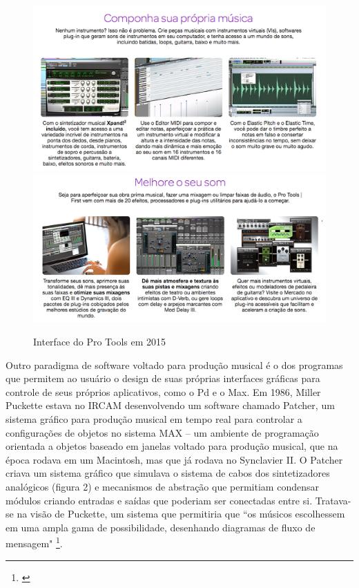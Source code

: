 \begin{figure}
    \caption{\label{protools}Interface do Pro Tools em 2015 }
    
        \includegraphics[width=0.8\linewidth]{pictures/protools}
        \includegraphics[width=0.8\linewidth]{pictures/protools2}
    
\end{figure}

Outro paradigma de software voltado para produção musical é o dos programas que permitem ao usuário o design de suas próprias interfaces gráficas para controle de seus próprios aplicativos, como o Pd e o Max. Em 1986, Miller Puckette estava no IRCAM desenvolvendo um software chamado Patcher, um sistema gráfico para produção musical em tempo real para controlar a configurações de objetos no sistema MAX – um ambiente de programação orientada a objetos baseado em janelas voltado para produção musical, que na época rodava em um Macintosh, mas que já rodava no Synclavier II. O Patcher criava um sistema gráfico que simulava o sistema de cabos dos sintetizadores analógicos (figura 2) e mecanismos de abstração que permitiam condensar módulos criando entradas e saídas que poderiam ser conectadas entre si. Tratava-se na visão de Puckette, um sistema que permitiria que ``os músicos escolhessem em uma ampla gama de possibilidade, desenhando diagramas de fluxo de mensagem" \footnote{\cite[5]{PucketteMiller}}. 

